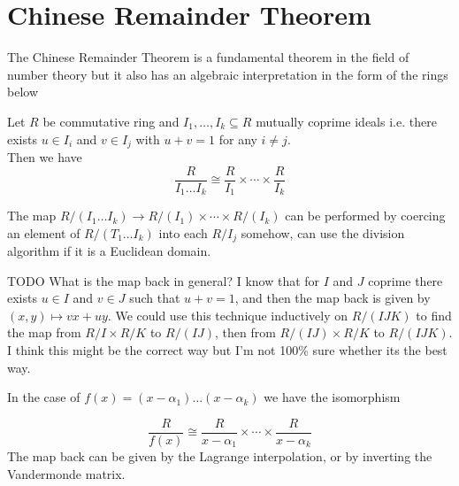 \section{Chinese Remainder Theorem}%
\label{sec:crt}

The Chinese Remainder Theorem is a fundamental theorem in the field of number theory but it also has an algebraic interpretation in the form of the rings below

\begin{theorem}
    Let $R$ be commutative ring and $I_1, \ldots, I_k \subseteq R$ mutually coprime ideals i.e. there exists $u \in I_i$ and $v \in I_j$ with $u + v = 1$ for any $i \neq j$.\\
    Then we have
    \[
        \frac{R}{I_1\ldots I_k} \cong \frac{R}{I_1} \times \cdots \times \frac{R}{I_k}
    \]
\end{theorem}

The map $R/(I_1\ldots I_k) \to R/(I_1) \times \cdots \times R/(I_k)$ can be performed by coercing an element of $R/(T_1 \ldots I_k)$ into each $R / I_j$ somehow, can use the division algorithm if it is a Euclidean domain. 

TODO What is the map back in general? I know that for $I$ and $J$ coprime there exists $u \in I$ and $v \in J$ such that $u + v = 1$, and then the map back is given by $(x, y) \mapsto vx + uy$. We could use this technique inductively on $R/(IJK)$ to find the map from $R / I \times R / K$ to $R / (IJ)$, then from $R / (IJ) \times R / K$ to $R / (IJK)$. I think this might be the correct way but I'm not 100\% sure whether its the best way.

In the case of $f(x) = (x - \alpha_1) \ldots (x - \alpha_k)$ we have the isomorphism

\[
    \frac{R}{f(x)} \cong \frac{R}{x - \alpha_1} \times \cdots \times \frac{R}{x - \alpha_k}
\]
The map back can be given by the Lagrange interpolation, or by inverting the Vandermonde matrix. 
